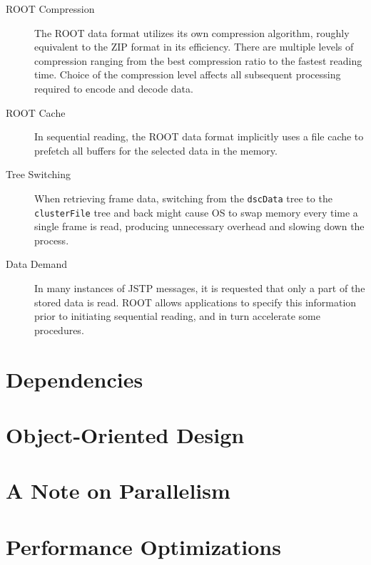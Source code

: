 \begin{description}
	\item[ROOT Compression]
	The ROOT data format utilizes its own compression algorithm, roughly equivalent to the ZIP format in its efficiency. There are multiple levels of compression ranging from the best compression ratio to the fastest reading time. Choice of the compression level affects all subsequent processing required to encode and decode data.

	\item[ROOT Cache]
	In sequential reading, the ROOT data format implicitly uses a file cache to prefetch all buffers for the selected data in the memory.

	\item[Tree Switching]
	When retrieving frame data, switching from the \texttt{dscData} tree to the \texttt{clusterFile} tree and back might cause OS to swap memory every time a single frame is read, producing unnecessary overhead and slowing down the process.

	\item[Data Demand]
	In many instances of JSTP messages, it is requested that only a part of the stored data is read. ROOT allows applications to specify this information prior to initiating sequential reading, and in turn accelerate some procedures.
\end{description}

\section{Dependencies}

\section{Object-Oriented Design}

\section{A Note on Parallelism}

\section{Performance Optimizations}
